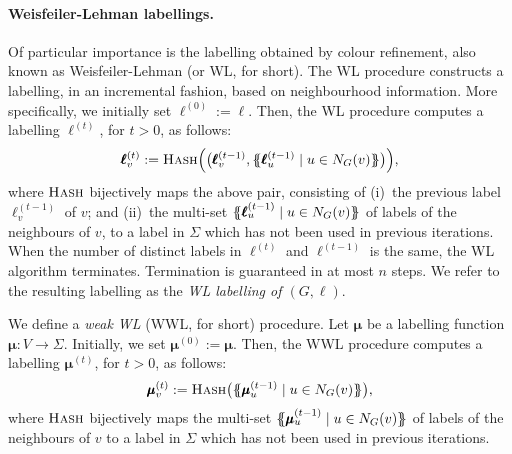 \paragraph*{Weisfeiler-Lehman labellings.}
Of particular importance is the labelling obtained by colour refinement, also
known as Weisfeiler-Lehman (or WL, for short). The WL procedure constructs a
labelling, in an incremental fashion, based on neighbourhood information. More
specifically, we initially set
$\pmb{\ell}^{(0)}:=\pmb{\ell}$. Then, the WL procedure computes a labelling
$\pmb{\ell}^{(t)}$, for $t> 0$, as follows:
\[
    \pmb{\ell}^{(t)}_v:=\textsc{Hash}\Bigl(\bigl(\pmb{\ell}^{(t-1)}_v,\{\!\!\{
    \pmb{\ell}_u^{(t-1)} \mathrel{\mid} u \in N_G(v) \}\!\!\}\bigr)\Bigr),
\]
where
$\textsc{Hash}$ bijectively maps the above pair, consisting of (i)~the
previous label $\pmb{\ell}^{(t-1)}_v$ of $v$; and (ii)~the multi-set $\{\!\!\{
\pmb{\ell}_u^{(t-1)} \mathrel{\mid} u \in N_G(v) \}\!\!\}$ of labels of the neighbours of $v$, to
a label in $\Sigma$ which has not been used in previous iterations.
When the number of distinct labels in $\pmb{\ell}^{(t)}$ and
$\pmb{\ell}^{(t-1)}$ is the same, the WL algorithm terminates. Termination
is guaranteed in at most $n$ steps. We refer to the resulting labelling as the
\textit{WL labelling of $(G,\pmb{\ell})$}. 

We define a \textit{weak WL} (WWL, for short) procedure.  Let $\pmb{\mu}$ be a
labelling function $\pmb{\mu}:V\to \Sigma$.
Initially, we set $\pmb{\mu}^{(0)}:=\pmb{\mu}$.  Then, the WWL procedure
computes a labelling $\pmb{\mu}^{(t)}$, for $t> 0$, as follows:
\[
    \pmb{\mu}^{(t)}_v:=\textsc{Hash}\bigl(\{\!\!\{ \pmb{\mu}_u^{(t-1)} \mathrel{\mid} u \in
    N_G(v) \}\!\!\}\bigr),
\]
where $\textsc{Hash}$ bijectively maps the multi-set $\{\!\!\{
\pmb{\mu}_u^{(t-1)} \mathrel{\mid} u \in N_G(v) \}\!\!\}$ of labels of the neighbours of $v$
to a label in $\Sigma$ which has not been used in previous iterations. 

%
%
